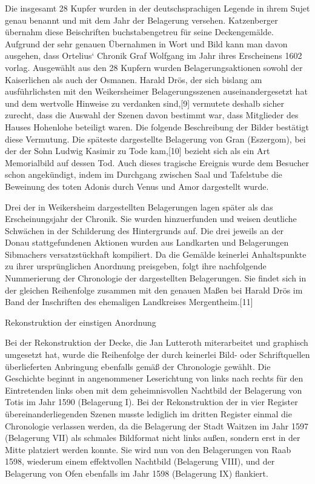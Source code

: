 \documentclass[
  a4paper,
  portrait]{book}
\begin{document}
Die insgesamt 28 Kupfer wurden in der deutschsprachigen Legende in ihrem
Sujet genau benannt und mit dem Jahr der Belagerung versehen.
Katzenberger übernahm diese Beischriften buchstabengetreu für seine
Deckengemälde. Aufgrund der sehr genauen Übernahmen in Wort und Bild
kann man davon ausgehen, dass Ortelius` Chronik Graf Wolfgang im Jahr
ihres Erscheinens 1602 vorlag. Ausgewählt aus den 28 Kupfern wurden
Belagerungsaktionen sowohl der Kaiserlichen als auch der Osmanen. Harald
Drös, der sich bislang am ausführlichsten mit den Weikersheimer
Belagerungsszenen auseinandergesetzt hat und dem wertvolle Hinweise zu
verdanken sind,{[}9{]} vermutete deshalb sicher zurecht, dass die
Auswahl der Szenen davon bestimmt war, dass Mitglieder des Hauses
Hohenlohe beteiligt waren. Die folgende Beschreibung der Bilder
bestätigt diese Vermutung. Die späteste dargestellte Belagerung von Gran
(Eszergom), bei der der Sohn Ludwig Kasimir zu Tode kam,{[}10{]} bezieht
sich als ein Art Memorialbild auf dessen Tod. Auch dieses tragische
Ereignis wurde dem Besucher schon angekündigt, indem im Durchgang
zwischen Saal und Tafelstube die Beweinung des toten Adonis durch Venus
und Amor dargestellt wurde.

Drei der in Weikersheim dargestellten Belagerungen lagen später als das
Erscheinungsjahr der Chronik. Sie wurden hinzuerfunden und weisen
deutliche Schwächen in der Schilderung des Hintergrunds auf. Die drei
jeweils an der Donau stattgefundenen Aktionen wurden aus Landkarten und
Belagerungen Sibmachers versatzstückhaft kompiliert. Da die Gemälde
keinerlei Anhaltspunkte zu ihrer ursprünglichen Anordnung preisgeben,
folgt ihre nachfolgende Nummerierung der Chronologie der dargestellten
Belagerungen. Sie findet sich in der gleichen Reihenfolge zusammen mit
den genauen Maßen bei Harald Drös im Band der Inschriften des ehemaligen
Landkreises Mergentheim.{[}11{]}

Rekonstruktion der einstigen Anordnung

Bei der Rekonstruktion der Decke, die Jan Lutteroth miterarbeitet und
graphisch umgesetzt hat, wurde die Reihenfolge der durch keinerlei Bild-
oder Schriftquellen überlieferten Anbringung ebenfalls gemäß der
Chronologie gewählt. Die Geschichte beginnt in angenommener Leserichtung
von links nach rechts für den Eintretenden links oben mit dem
geheimnisvollen Nachtbild der Belagerung von Totis im Jahr 1590
(Belagerung I). Bei der Rekonstruktion der in vier Register
übereinanderliegenden Szenen musste lediglich im dritten Register einmal
die Chronologie verlassen werden, da die Belagerung der Stadt Waitzen im
Jahr 1597 (Belagerung VII) als schmales Bildformat nicht links außen,
sondern erst in der Mitte platziert werden konnte. Sie wird nun von den
Belagerungen von Raab 1598, wiederum einem effektvollen Nachtbild
(Belagerung VIII), und der Belagerung von Ofen ebenfalls im Jahr 1598
(Belagerung IX) flankiert.
\end{document}
